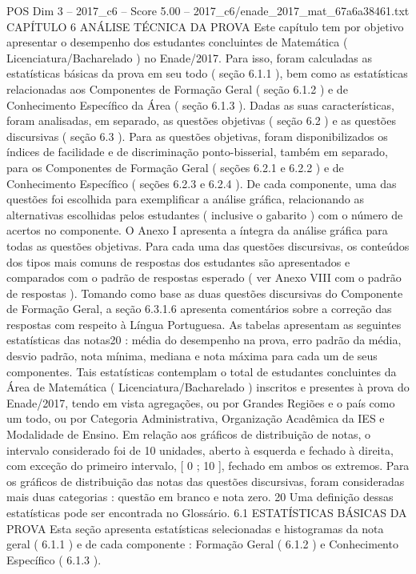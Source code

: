 \begin{textsample}{POS Dim 3 – 2017\_c6 – Score 5.00 – 2017\_c6/enade\_2017\_mat\_67a6a38461.txt}  \label{ex:f3_pos_191}
CAPÍTULO 6 ANÁLISE TÉCNICA DA PROVA Este capítulo tem por objetivo apresentar o desempenho dos estudantes concluintes de Matemática ( Licenciatura/Bacharelado ) no Enade/2017.
Para isso, foram calculadas as estatísticas básicas da prova em seu todo ( seção 6.1.1 ), bem como as estatísticas relacionadas aos Componentes de Formação Geral ( seção 6.1.2 ) e de Conhecimento Específico da Área ( seção 6.1.3 ).
Dadas as suas características, foram analisadas, em separado, as questões objetivas ( seção 6.2 ) e as questões discursivas ( seção 6.3 ).
Para as questões objetivas, foram disponibilizados os índices de facilidade e de discriminação ponto-bisserial, também em separado, para os Componentes de Formação Geral ( seções 6.2.1 e 6.2.2 ) e de Conhecimento Específico ( seções 6.2.3 e 6.2.4 ).
De cada componente, uma das questões foi escolhida para exemplificar a análise gráfica, relacionando as alternativas escolhidas pelos estudantes ( inclusive o gabarito ) com o número de acertos no componente.
O Anexo I apresenta a íntegra da análise gráfica para todas as questões objetivas.
Para cada uma das questões discursivas, os conteúdos dos tipos mais comuns de respostas dos estudantes são apresentados e comparados com o padrão de respostas esperado ( ver Anexo VIII com o padrão de respostas ).
Tomando como base as duas questões discursivas do Componente de Formação Geral, a seção 6.3.1.6 apresenta comentários sobre a correção das respostas com respeito à Língua Portuguesa.
As tabelas apresentam as seguintes estatísticas das notas20 : média do desempenho na prova, erro padrão da média, desvio padrão, nota mínima, mediana e nota máxima para cada um de seus componentes.
Tais estatísticas contemplam o total de estudantes concluintes da Área de Matemática ( Licenciatura/Bacharelado ) inscritos e presentes à prova do Enade/2017, tendo em vista agregações, ou por Grandes Regiões e o país como um todo, ou por Categoria Administrativa, Organização Acadêmica da IES e Modalidade de Ensino.
Em relação aos gráficos de distribuição de notas, o intervalo considerado foi de 10 unidades, aberto à esquerda e fechado à direita, com exceção do primeiro intervalo, [ 0 ; 10 ], fechado em ambos os extremos.
Para os gráficos de distribuição das notas das questões discursivas, foram consideradas mais duas categorias : questão em branco e nota zero. 20 Uma definição dessas estatísticas pode ser encontrada no Glossário. 6.1 ESTATÍSTICAS BÁSICAS DA PROVA Esta seção apresenta estatísticas selecionadas e histogramas da nota geral ( 6.1.1 ) e de cada componente : Formação Geral ( 6.1.2 ) e Conhecimento Específico ( 6.1.3 ).

\end{textsample}
